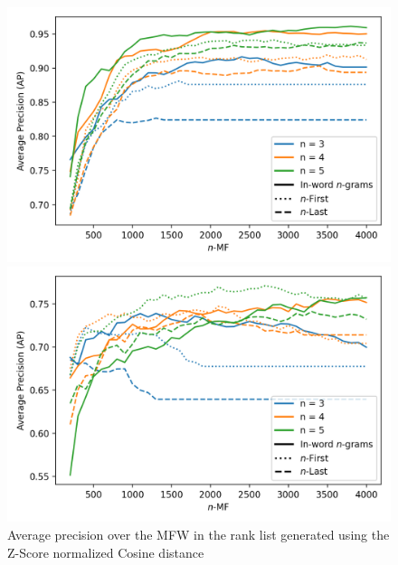 \begin{figure}
  \centering
  \caption{Average precision over the MFW in the rank list generated using the Z-Score normalized Cosine distance}
  \label{fig:first_last_letters_ngrams}

  \label{fig:first_last_letters_ngrams_oxquarry}
  \includegraphics[width=\linewidth]{img/first_last_letters_ngrams_oxquarry.png}

  \vspace{0.5cm}

  \label{fig:first_last_letters_ngrams_brunet}
  \includegraphics[width=\linewidth]{img/first_last_letters_ngrams_brunet.png}

  \vspace{0.5cm}


\end{figure}
